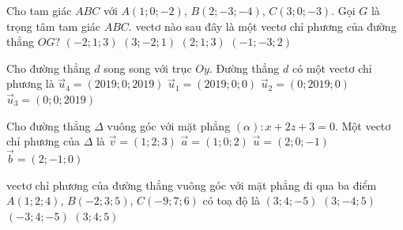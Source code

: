 \begin{ex}%
	Cho tam giác $ABC$ với $A(1;0;-2)$, $B(2;-3;-4)$, $C(3;0;-3)$. Gọi $G$ là trọng tâm tam giác $ABC$. vectơ nào sau đây là một vectơ chỉ phương của đường thẳng $OG$?
	\choice
	{\True $(-2;1;3)$}
	{$(3;-2;1)$}
	{$(2;1;3)$}
	{$(-1;-3;2)$}
\end{ex}

\begin{ex}
	Cho đường thẳng $d$ song song với trục $Oy$. Đường thẳng $d$ có một vectơ chỉ phương là
	\choice
	{$\overrightarrow{u}_4=(2019;0;2019)$}
	{$\overrightarrow{u}_1=(2019;0;0)$}
	{\True $\overrightarrow{u}_2=(0;2019;0)$}
	{$\overrightarrow{u}_3=(0;0;2019)$}
\end{ex}

\begin{ex}%
	Cho đường thẳng $\Delta$ vuông góc với mặt phẳng $(\alpha) \colon x+2z+3=0$. Một vectơ chỉ phương của $\Delta$ là
	\choice
	{$\overrightarrow{v}=(1;2;3)$}
	{\True $\overrightarrow{a}=(1;0;2)$}
	{$\overrightarrow{u}=(2;0;-1)$}
	{$\overrightarrow{b}=(2;-1;0)$}
\end{ex}

\begin{ex}%
	vectơ chỉ phương của đường thẳng vuông góc với mặt phẳng đi qua ba điểm $A(1;2;4)$, $B(-2;3;5)$, $C(-9;7;6)$ có toạ độ là
	\choice
	{$(3;4;-5)$}
	{$(3;-4;5)$}
	{$(-3;4;-5)$}
	{\True $(3;4;5)$}
\end{ex}

